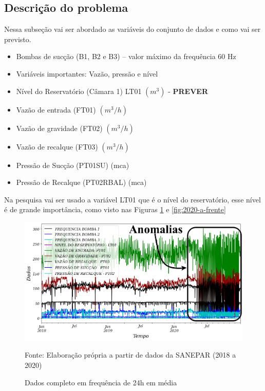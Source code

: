 \subsection{Descri\c c\~ao do problema} \label{subsec:descricao}

Nessa subseção vai ser abordado as variáveis do conjunto de dados e como vai ser previsto.

\begin{itemize}
\item Bombas de sucção (B1, B2 e B3) – valor máximo da frequência 60 Hz

\item[] Variáveis importantes: Vazão, pressão e nível

\item Nível do Reservatório (Câmara 1) LT01 $ (m^3) $ - \textbf{PREVER}

\item Vazão de entrada (FT01) $ (m^3/h) $

\item Vazão de gravidade (FT02) $ (m^3/h) $

\item Vazão de recalque (FT03) $ (m^3/h) $

\item Pressão de Sucção (PT01SU) (mca)

\item Pressão de Recalque (PT02RBAL) (mca)
\end{itemize}


Na pesquisa vai ser usado a variável LT01 que é o nível do reservatório, esse nível é de grande importância, como visto nas Figuras \ref{fig:dados-todos} e \ref{fig:2020-a-frente} 

\begin{figure}[H]
	\centering
	\caption{Dados completo em frequência de 24h em média}
	\label{fig:dados-todos}
	\includegraphics[width=1\linewidth]{"Introducao/Figuras/dados todos"}
	
	Fonte: Elaboração própria a partir de dados da SANEPAR (2018 a 2020)
\end{figure}


